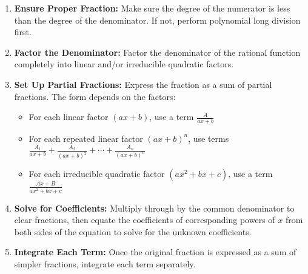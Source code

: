 \begin{enumerate}
    \item \textbf{Ensure Proper Fraction:} Make sure the degree of the numerator is less than the degree of the denominator. If not, perform polynomial long division first.
    
    \item \textbf{Factor the Denominator:} Factor the denominator of the rational function completely into linear and/or irreducible quadratic factors.
    
    \item \textbf{Set Up Partial Fractions:} Express the fraction as a sum of partial fractions. The form depends on the factors:
    \begin{itemize}
        \item For each linear factor $(ax + b)$, use a term $\frac{A}{ax+b}$
        
        \item For each repeated linear factor $(ax + b)^n$, use terms 
        $\frac{A_1}{ax+b} + \frac{A_2}{(ax+b)^2} + \cdots + \frac{A_n}{(ax+b)^n}$
        
        \item For each irreducible quadratic factor $(ax^2 + bx + c)$, use a term $\frac{Ax+B}{ax^2+bx+c}$
    \end{itemize}
    
    \item \textbf{Solve for Coefficients:} Multiply through by the common denominator to clear fractions, then equate the coefficients of corresponding powers of $x$ from both sides of the equation to solve for the unknown coefficients.
    
    \item \textbf{Integrate Each Term:} Once the original fraction is expressed as a sum of simpler fractions, integrate each term separately.
\end{enumerate}